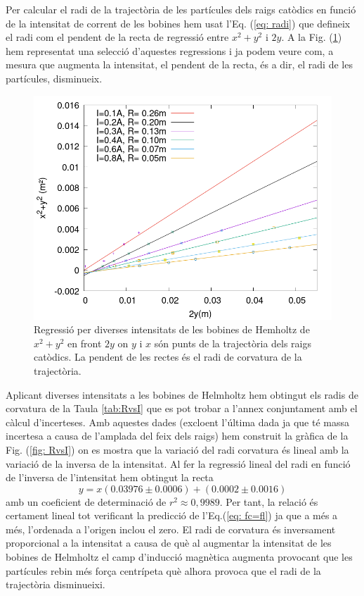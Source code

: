 \documentclass[11pt]{article}
\numberwithin{equation}{section}
\numberwithin{figure}{section}
\numberwithin{table}{section}
\begin{document}
Per calcular el radi de la trajectòria de les partícules dels raigs catòdics en funció de la intensitat de corrent de les bobines hem usat l'Eq. (\ref{eq: radi}) que defineix el radi com el pendent de la recta de regressió entre $x^2+y^2$ i $2y$. A la Fig. (\ref{fig: regressio_1}) hem representat una selecció d'aquestes regressions i ja podem veure com, a mesura que augmenta la intensitat, el pendent de la recta, és a dir, el radi de les partícules, disminueix. 
\begin{figure}[H]
    \centering
    \includegraphics[scale=0.3]{regressio_1.png}
    \caption{Regressió per diverses intensitats de les bobines de Hemholtz de $x^2+y^2$ en front $2y$ on $y$ i $x$ són punts de la trajectòria dels raigs catòdics. La pendent de les rectes és el radi de corvatura de la trajectòria.}
    \label{fig: regressio_1}
\end{figure}
Aplicant diverses intensitats a les bobines de Helmholtz hem obtingut els radis de corvatura de la Taula \ref{tab:RvsI} que es pot trobar a l'annex conjuntament amb el càlcul d'incerteses. Amb aquestes dades (excloent l'última dada ja que té massa incertesa a causa de l'amplada del feix dels raigs) hem construit la gràfica de la Fig. (\ref{fig: RvsI}) on es mostra que la variació del radi corvatura és lineal amb la variació de la inversa de la intensitat. 
Al fer la regressió lineal del radi en funció de l'inversa de l'intensitat hem obtingut la recta
\begin{equation}
    y=x(0.03976\pm0.0006)+(0.0002\pm0.0016)
\end{equation}  
amb un coeficient de determinació de $r^2\approx0,9989$. Per tant, la relació és certament lineal tot verificant la predicció de l'Eq.(\ref{eq: fc=fl}) ja que a més a més, l'ordenada a l'origen inclou el zero. El radi de corvatura és inversament proporcional a la intensitat a causa de què al augmentar la intensitat de les bobines de Helmholtz el camp d'inducció magnètica augmenta provocant que les partícules rebin més força centrípeta què alhora provoca que el radi de la trajectòria disminueixi.
\end{document}
